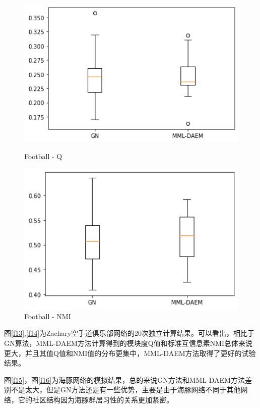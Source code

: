\documentclass[a4paper,12pt,openany,oneside,utf-8]{ctexbook}
\begin{document}
	\begin{figure}[htp]
    \centering
    \begin{minipage}[t]{0.49\textwidth}
        \centering
        \includegraphics[width=1\textwidth]{figure/football-q.png}
        \caption{Football - Q}
        \label{f19}
    \end{minipage}
    \begin{minipage}[t]{0.49\textwidth}
        \centering
        \includegraphics[width=1\textwidth]{figure/football-nmi.png}
        \caption{Football - NMI}
        \label{f20}
        \end{minipage}
    \end{figure}
    图\ref{f13},\ref{f14}为Zachary空手道俱乐部网络的20次独立计算结果。可以看出，相比于GN算法，MML-DAEM方法计算得到的模块度Q值和标准互信息素NMI总体来说更大，并且其值Q值和NMI值的分布更集中，MML-DAEM方法取得了更好的试验结果。
    
    图\ref{f15}，图\ref{f16}为海豚网络的模拟结果，总的来说GN方法和MML-DAEM方法差别不是太大，但是GN方法还是有一些优势，主要是由于海豚网络不同于其他网络，它的社区结构因为海豚群居习性的关系更加紧密。
    
\end{document}
